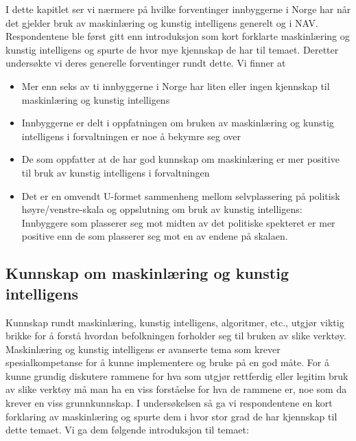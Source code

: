 \documentclass[
  12pt,
  a4paper, 12pt]{article}
\providecommand{\tightlist}{%
  \setlength{\itemsep}{0pt}\setlength{\parskip}{0pt}}
\begin{document}
I dette kapitlet ser vi nærmere på hvilke forventinger innbyggerne i Norge har når det gjelder bruk av maskinlæring og kunstig intelligens generelt og i NAV. Respondentene ble først gitt enn introduksjon som kort forklarte maskinlæring og kunstig intelligens og spurte de hvor mye kjennskap de har til temaet. Deretter undersøkte vi deres generelle forventinger rundt dette. Vi finner at

\begin{itemize}
\tightlist
\item
  Mer enn seks av ti innbyggerne i Norge har liten eller ingen kjennskap til maskinlæring og kunstig intelligens
\item
  Innbyggerne er delt i oppfatningen om bruken av maskinlæring og kunstig intelligens i forvaltningen er noe å bekymre seg over
\item
  De som oppfatter at de har god kunnskap om maskinlæring er mer positive til bruk av kunstig intelligens i forvaltningen
\item
  Det er en omvendt U-formet sammenheng mellom selvplassering på politisk høyre/venstre-skala og oppslutning om bruk av kunstig intelligens:
  Innbyggere som plasserer seg mot midten av det politiske spekteret er mer positive enn de som plasserer seg mot en av endene på skalaen.
\end{itemize}

\hypertarget{kunnskap-om-maskinluxe6ring-og-kunstig-intelligens}{%
\subsection{Kunnskap om maskinlæring og kunstig intelligens}\label{kunnskap-om-maskinluxe6ring-og-kunstig-intelligens}}

Kunnskap rundt maskinlæring, kunstig intelligens, algoritmer, etc., utgjør viktig brikke for å forstå hvordan befolkningen forholder seg til bruken av slike verktøy.
Maskinlæring og kunstig intelligens er avanserte tema som krever spesialkompetanse for å kunne implementere og bruke på en god måte.
For å kunne grundig diskutere rammene for hva som utgjør rettferdig eller legitim bruk av slike verktøy må man ha en viss forståelse for hva de rammene er, noe som da krever en viss grunnkunnskap.
I undersøkelsen så ga vi respondentene en kort forklaring av maskinlæring og spurte dem i hvor stor grad de har kjennskap til dette temaet. Vi ga dem følgende introduksjon til temaet:
\end{document}
